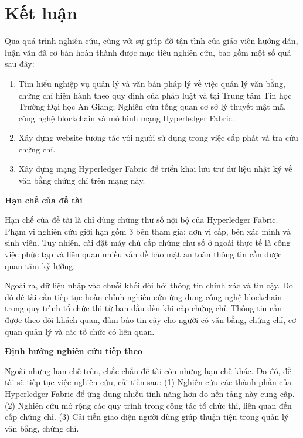 \chapter{Kết luận}
Qua quá trình nghiên cứu, cùng với sự giúp đỡ tận tình của giáo viên hướng dẫn, luận văn đã cơ bản hoàn thành được mục tiêu nghiên cứu, bao gồm một số quả sau đây:

\begin{enumerate}

\item Tìm hiểu nghiệp vụ quản lý và văn bản pháp lý về việc quản lý văn bằng, chứng chỉ hiện hành theo quy định của pháp luật và tại Trung tâm Tin học Trường Đại học An Giang; Nghiên cứu tổng quan cơ sở lý thuyết mật mã, công nghệ blockchain và mô hình mạng Hyperledger Fabric.

\item Xây dựng website tương tác với người sử dụng trong việc cấp phát và tra cứu chứng chỉ.

\item Xây dựng mạng Hyperledger Fabric để triển khai lưu trữ dữ liệu nhật ký về văn bằng chứng chỉ trên mạng này.
\end{enumerate}

\textbf{Hạn chế của đề tài}

Hạn chế của đề tài là chỉ dùng chứng thư số nội bộ của Hyperledger Fabric. Phạm vi nghiên cứu giới hạn gồm 3 bên tham gia: đơn vị cấp, bên xác minh và sinh viên. Tuy nhiên, cài đặt máy chủ cấp chứng chư số ở ngoài thực tế là công việc phức tạp và liên quan nhiều vấn đề bảo mật an toàn thông tin cần được quan tâm kỹ lưỡng.

Ngoài ra, dữ liệu nhập vào chuỗi khối đòi hỏi thông tin chính xác và tin cậy. Do đó đề tài cần tiếp tục hoàn chỉnh nghiên cứu ứng dụng công nghệ blockchain trong quy trình tổ chức thi từ ban đầu đến khi cấp chứng chỉ. Thông tin cần được theo dõi khách quan, đảm bảo tin cậy cho người có văn bằng, chứng chỉ, cơ quan quản lý  và các tổ chức có liên quan.

\textbf{Định hướng nghiên cứu tiếp theo}

Ngoài những hạn chế trên, chắc chắn đề tài còn những hạn chế khác. Do đó, đề tài sẽ tiếp tục việc nghiên cứu, cải tiến sau: (1) Nghiên cứu các thành phần của Hyperledger Fabric để ứng dụng nhiều tính năng hơn do nền tảng này cung cấp.  (2) Nghiên cứu mở rộng các quy trình trong công tác tổ chức thi, liên quan đến cấp chứng chỉ. (3) Cải tiến giao diện người dùng giúp thuận tiện trong quản lý văn bằng, chứng chỉ.
